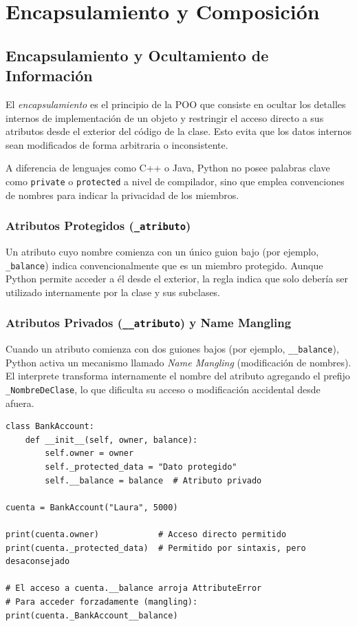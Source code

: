 \chapter{Encapsulamiento y Composición}

\section{Encapsulamiento y Ocultamiento de Información}
El \textit{encapsulamiento} es el principio de la POO que consiste en ocultar los detalles internos de implementación
de un objeto y restringir el acceso directo a sus atributos desde el exterior del código de la clase.
Esto evita que los datos internos sean modificados de forma arbitraria o inconsistente.

A diferencia de lenguajes como C++ o Java, Python no posee palabras clave como \texttt{private} o \texttt{protected}
a nivel de compilador, sino que emplea convenciones de nombres para indicar la privacidad de los miembros.

\subsection{Atributos Protegidos (\texttt{\_atributo})}
Un atributo cuyo nombre comienza con un único guion bajo (por ejemplo, \texttt{\_balance}) indica convencionalmente
que es un miembro protegido. Aunque Python permite acceder a él desde el exterior, la regla indica que solo debería
ser utilizado internamente por la clase y sus subclases.

\subsection{Atributos Privados (\texttt{\_\_atributo}) y Name Mangling}
Cuando un atributo comienza con dos guiones bajos (por ejemplo, \texttt{\_\_balance}), Python activa un mecanismo
llamado \textit{Name Mangling} (modificación de nombres). El interprete transforma internamente el nombre del atributo
agregando el prefijo \texttt{\_NombreDeClase}, lo que dificulta su acceso o modificación accidental desde afuera.

\begin{lstlisting}[caption={Diferencia entre atributos protegidos y privados.}, label={list:name_mangling}]
class BankAccount:
    def __init__(self, owner, balance):
        self.owner = owner
        self._protected_data = "Dato protegido"
        self.__balance = balance  # Atributo privado

cuenta = BankAccount("Laura", 5000)

print(cuenta.owner)            # Acceso directo permitido
print(cuenta._protected_data)  # Permitido por sintaxis, pero desaconsejado

# El acceso a cuenta.__balance arroja AttributeError
# Para acceder forzadamente (mangling): print(cuenta._BankAccount__balance)
\end{lstlisting}

